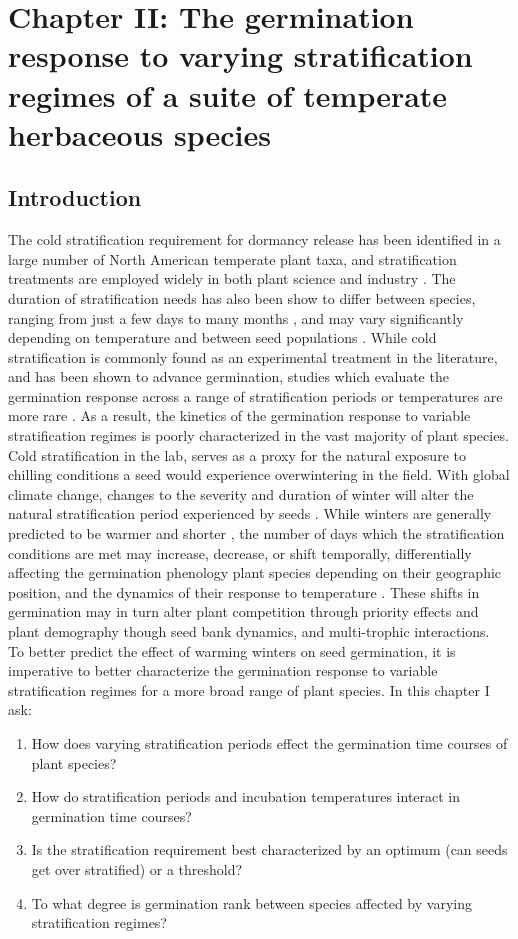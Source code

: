 \documentclass{article}\usepackage[]{graphicx}\usepackage[]{color}
\begin{document}
\section*{Chapter II: The germination response to varying stratification regimes of a suite of temperate herbaceous species}
\subsection*{Introduction}
\indent\indent The cold stratification requirement for dormancy release has been identified in a large number of North American temperate plant taxa, and stratification treatments are employed widely in both plant science and industry \citep{Hartmann_2011}. The duration of stratification needs has also been show to differ between species, ranging from just a few days to many months \citep{Luna2009}, and may vary significantly depending on temperature and between seed populations \citep{Steadman2004}. While cold stratification is commonly found as an experimental treatment in the literature, and has been shown to advance germination, studies which evaluate the germination response across a range of stratification periods or temperatures are more rare \citep{Batlla2009}. As a result, the kinetics of the germination response to variable stratification regimes is poorly characterized in the vast majority of plant species.\\
\indent Cold stratification in the lab, serves as a proxy for the natural exposure to chilling conditions a seed would experience overwintering in the field. With global climate change, changes to the severity and duration of winter will alter the natural stratification period experienced by seeds \citep{Walck2011}. While winters are generally predicted to be warmer and shorter \citep{IPCC_2014}, the number of days which the stratification conditions are met may increase, decrease, or shift temporally, differentially affecting the germination phenology plant species depending on their geographic position, and the dynamics of their response to temperature \citep{Walck2011}. These shifts in germination may in turn alter plant competition through priority effects \citep{Gioria2018} and plant demography though seed bank dynamics, and multi-trophic interactions.\\
\indent To better predict the effect of warming winters on seed germination, it is imperative to better characterize the germination response to variable stratification regimes for a more broad range of plant species. In this chapter I ask:
\begin{enumerate}
\item How does varying stratification periods effect the germination time courses of plant species?
\item How do stratification periods and incubation temperatures interact in germination time courses?
\item Is the stratification requirement best characterized by an optimum (can seeds get over stratified) or a threshold?
\item To what degree is germination rank between species affected by varying stratification regimes?
\end{enumerate}
\end{document}
